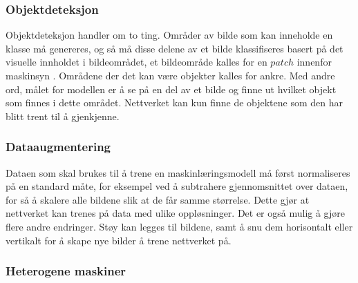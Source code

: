 \subsubsection{Objektdeteksjon}

Objektdeteksjon handler om to ting. Områder av bilde som kan inneholde en klasse må genereres, og så må disse delene av et bilde klassifiseres basert på det visuelle innholdet i bildeområdet, et bildeområde kalles for en $patch$ innenfor maskinsyn \cite{LeCun m.fl. 1998 s. 23}. Områdene der det kan være objekter kalles for ankre. Med andre ord, målet for modellen er å se på en del av et bilde og finne ut hvilket objekt som finnes i dette området. Nettverket kan kun finne de objektene som den har blitt trent til å gjenkjenne.

\subsubsection{Dataaugmentering}

Dataen som skal brukes til å trene en maskinlæringsmodell må først normaliseres på en standard måte, for eksempel ved å subtrahere gjennomsnittet over dataen, for så å skalere alle bildene slik at de får samme størrelse. Dette gjør at nettverket kan trenes på data med ulike oppløsninger. Det er også mulig å gjøre flere andre endringer. Støy kan legges til bildene, samt å snu dem horisontalt eller vertikalt for å skape nye bilder å trene nettverket på. \cite{Cadieu m.fl. 2014 s. 15}

\subsubsection{Heterogene maskiner}


